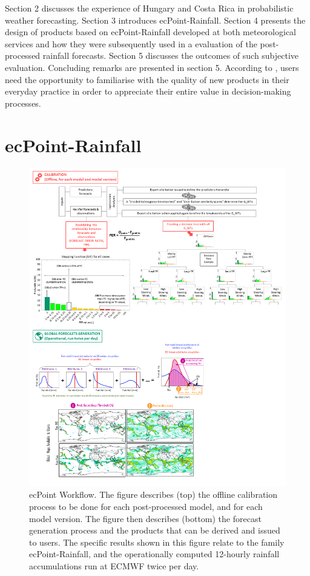 \documentclass[twocol]{ametsocV5} %
\begin{document}
Section 2 discusses the experience of Hungary and Costa Rica in probabilistic weather forecasting. Section 3  introduces ecPoint-Rainfall. Section 4 presents the design of products based on ecPoint-Rainfall developed at both meteorological services and how they were subsequently used in a  evaluation of the post-processed rainfall forecasts. Section 5 discusses the outcomes of such subjective evaluation. Concluding remarks are presented in section 5.
According to \citet{Fundel2019}, users need the opportunity to familiarise with the quality of new products in their everyday practice in order to appreciate their entire value in decision-making processes.




\section{ecPoint-Rainfall}

\begin{figure}
\centerline{\includegraphics[width=39pc]{manuscript/Figures/Fig1.png}}
\caption{ecPoint Workflow. The figure describes (top) the offline calibration process to be done for each post-processed model, and for each model version. The figure then describes (bottom) the forecast generation process and the products that can be derived and issued to users. The specific results shown in this figure relate to the family ecPoint-Rainfall, and the operationally computed 12-hourly rainfall accumulations run at ECMWF twice per day.}
\label{Fig.1}
\end{figure}
\end{document}
